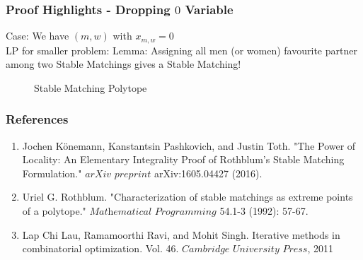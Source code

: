 \documentclass[10pt]{beamer}
\begin{document}
\begin{frame}
\frametitle{Proof Highlights - Dropping $0$ Variable}

\begin{overprint}
\alert{Case:} We have $(m,w)$ with $x_{m,w} = 0$ \\
LP for smaller problem:
\alert{Lemma:} Assigning all men (or women) favourite partner among two Stable Matchings gives a Stable Matching!
\end{overprint}
\begin{figure}[h]
\caption{Stable Matching Polytope}
\end{figure}
\end{frame}

\begin{frame}
\frametitle{References}
\begin{enumerate}
\item Jochen Könemann, Kanstantsin Pashkovich, and Justin Toth. \alert{"The Power of Locality: An Elementary Integrality Proof of Rothblum's Stable Matching Formulation."} $\textit{arXiv preprint}$ arXiv:1605.04427 (2016).
\item Uriel G. Rothblum. \alert{"Characterization of stable matchings as extreme points of a polytope."} $\textit{Mathematical Programming}$ 54.1-3 (1992): 57-67.
\item Lap Chi Lau, Ramamoorthi Ravi, and Mohit Singh. \alert{Iterative methods in combinatorial optimization}. Vol. 46. $\textit{Cambridge University Press}$, 2011
\end{enumerate}
\end{frame}
\end{document}
